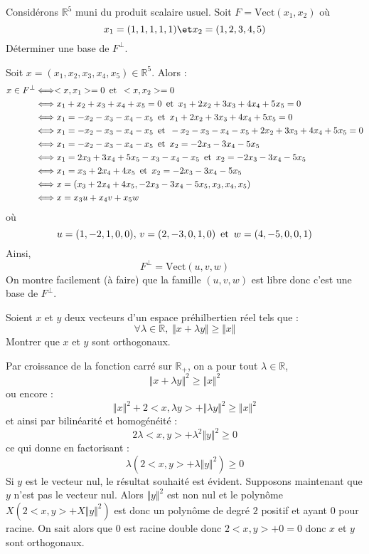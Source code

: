 \documentclass[a4paper,10pt]{report}
\begin{document}
\begin{Exa} Considérons $\mathbb{R}^5$ muni du produit scalaire usuel. Soit $F= \textrm{Vect}(x_1,x_2)$ où
$$ x_1 = (1,1,1,1,1) \et x_2 = (1,2,3,4,5)$$
Déterminer une base de $F^{\perp}$.
\end{Exa} 

\corr Soit $x= (x_1,x_2,x_3,x_4,x_5) \in \mathbb{R}^5$. Alors :
\begin{align*}
x \in F^{\perp} & \Longleftrightarrow <x,x_1>=0 \, \hbox{ et } \,  <x,x_2>=0 \\
& \Longleftrightarrow x_1+x_2+x_3+x_4+x_5=0 \, \hbox{ et } \, x_1+2x_2+3x_3+4x_4+5x_5=0 \\
& \Longleftrightarrow x_1=-x_2-x_3-x_4-x_5 \, \hbox{ et } \, x_1+2x_2+3x_3+4x_4+5x_5=0 \\
& \Longleftrightarrow x_1=-x_2-x_3-x_4-x_5 \, \hbox{ et } \, -x_2-x_3-x_4-x_5+2x_2+3x_3+4x_4+5x_5=0 \\
&  \Longleftrightarrow x_1=-x_2-x_3-x_4-x_5 \, \hbox{ et } \, x_2=-2x_3-3x_4-5x_5 \\
&  \Longleftrightarrow x_1=2x_3+3x_4+5x_5-x_3-x_4-x_5 \, \hbox{ et } \, x_2=-2x_3-3x_4-5x_5 \\
&  \Longleftrightarrow x_1=x_3+2x_4+4x_5 \, \hbox{ et } \, x_2=-2x_3-3x_4-5x_5 \\
& \Longleftrightarrow x= (x_3+2x_4+4x_5, -2x_3-3x_4-5x_5,x_3,x_4,x_5) \\
& \Longleftrightarrow x= x_3 u+x_4 v+ x_5w
\end{align*}
où
$$ u=(1,-2,1,0,0), \, v =(2,-3,0,1,0) \, \hbox{ et } \, w=(4,-5,0,0,1)$$
Ainsi,
$$ F^{\perp} = \textrm{Vect}(u,v,w)$$
On montre facilement (à faire) que la famille $(u,v,w)$ est libre donc c'est une base de $F^{\perp}$.

\begin{Exa} Soient $x$ et $y$ deux vecteurs d'un espace préhilbertien réel tels que :
$$ \forall \lambda \in \mathbb{R}, \; \Vert x+\lambda y \Vert \geq \Vert x \Vert$$
Montrer que $x$ et $y$ sont orthogonaux.
\end{Exa}

\corr Par croissance de la fonction carré sur $\mathbb{R}_{+}$, on a pour tout $\lambda \in \mathbb{R}$,
$$ \Vert x+\lambda y \Vert^2 \geq \Vert x \Vert^2$$
ou encore :
$$ \Vert x \Vert^2 + 2  <x,\lambda y> + \Vert \lambda y \Vert^2 \geq \Vert x \Vert^2$$
et ainsi par bilinéarité et homogénéité :
$$ 2 \lambda <x,y> + \lambda^2 \Vert y \Vert^2 \geq 0$$
ce qui donne en factorisant :
$$ \lambda (2<x,y> + \lambda \Vert y \Vert^2) \geq 0$$
Si $y$ est le vecteur nul, le résultat souhaité est évident. Supposons maintenant que $y$ n'est pas le vecteur nul. Alors $\Vert y \Vert^2$ est non nul et le polynôme $X(2<x,y>+ X \Vert y \Vert^2)$ est donc un polynôme de degré $2$ positif et ayant $0$ pour racine. On sait alors que $0$ est racine double donc $2<x,y>+0=0$ donc $x$ et $y$ sont orthogonaux.
\end{document}
